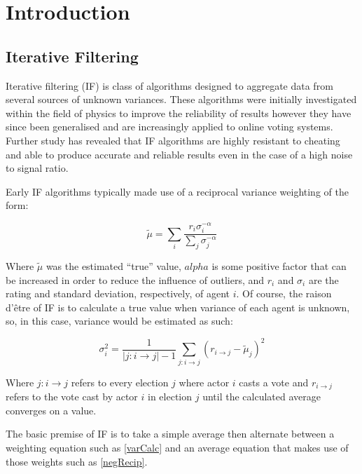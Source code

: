 
\chapter{Introduction} %

\section{Iterative Filtering}
Iterative filtering (IF) is class of algorithms designed to aggregate data from several sources of unknown variances. These algorithms were initially investigated within the field of physics to improve the reliability of results however they have since been generalised and are increasingly applied to online voting systems. Further study has revealed that IF algorithms are highly resistant to cheating and able to produce accurate and reliable results even in the case of a high noise to signal ratio.

Early IF algorithms typically made use of a reciprocal variance weighting of the form:

\begin{equation}
    \tilde{\mu} = \sum\limits_i\frac{r_i\sigma_i^{-\alpha}}{\sum\limits_j \sigma_j^{-\alpha}} \label{negRecip}
\end{equation}

Where $\tilde{\mu}$ was the estimated ``true'' value, $alpha$ is some positive factor that can be increased in order to reduce the influence of outliers, and $r_i$ and $\sigma_i$ are the rating and standard deviation, respectively, of agent $i$. Of course, the raison d'\^etre of IF is to calculate a true value when variance of each agent is unknown, so, in this case, variance would be estimated as such:

\begin{equation}
\sigma_i^2 = \frac{1}{|j:i\rightarrow j| - 1}\sum\limits_{j:i\rightarrow j}(r_{i\rightarrow j} - \tilde{\mu}_j)^2 \label{varCalc}
\end{equation}

Where $j:i\rightarrow j$ refers to every election $j$ where actor $i$ casts a vote and $r_{i\rightarrow j}$ refers to the vote cast by actor $i$ in election $j$ until the calculated average converges on a value.

The basic premise of IF is to take a simple average then alternate between a weighting equation such as \ref{varCalc} and an average equation that makes use of those weights such as \ref{negRecip}.


